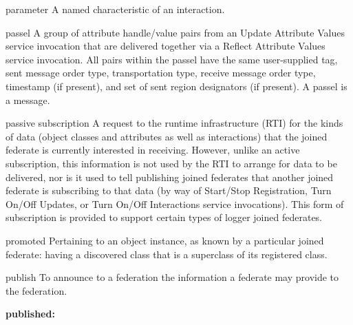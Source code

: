 \begin{definition}{parameter}
    A named characteristic of an interaction.
\end{definition}

\begin{definition}{passel}
    A group of attribute handle/value pairs from an Update Attribute Values service invocation that are delivered together via a Reflect Attribute Values \textdagger{} service invocation. All pairs within the passel have the same user-supplied tag, sent message order type, transportation type, receive message order type, timestamp (if present), and set of sent region designators (if present). A passel is a message.
\end{definition}

\begin{definition}{passive subscription}
    A request to the runtime infrastructure (RTI) for the kinds of data (object classes and attributes as well as interactions) that the joined federate is currently interested in receiving. However, unlike an active subscription, this information is not used by the RTI to arrange for data to be delivered, nor is it used to tell publishing joined federates that another joined federate is subscribing to that data (by way of Start/Stop Registration, Turn On/Off Updates, or Turn On/Off Interactions service invocations). This form of subscription is provided to support certain types of logger joined federates.
\end{definition}

\begin{definition}{promoted}
    Pertaining to an object instance, as known by a particular joined federate: having a discovered class that is a superclass of its registered class.
\end{definition}


\begin{definition}{publish}
    To announce to a federation the information a federate may provide to the federation.
\end{definition}

\par\noindent\textbf{published:}\par

